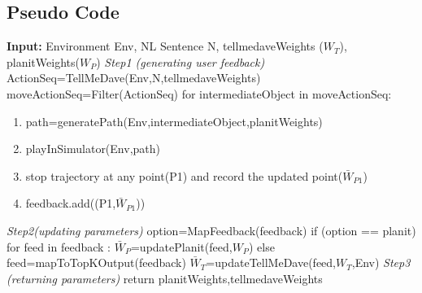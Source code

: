 \subsection{Pseudo Code}
\textbf{Input:} Environment Env, NL Sentence N, tellmedaveWeights ($W_{T}$), planitWeights($W_{P}$)
\newline \newline
\textit{Step1 (generating user feedback)} \newline \newline
ActionSeq=TellMeDave(Env,N,tellmedaveWeights)  
moveActionSeq=Filter(ActionSeq)  \newline  \newline
for intermediateObject in moveActionSeq:
\begin{enumerate}
\item path=generatePath(Env,intermediateObject,planitWeights)
\item playInSimulator(Env,path)
\item stop trajectory at any point(P1) and record the updated point($\bar{W}_{P1}$)
\item feedback.add((P1,$\bar{W}_{P1}$))
\end{enumerate}
\textit{Step2(updating parameters)} \newline \newline
option=MapFeedback(feedback) \newline
if (option == planit) \newline
\hphantom {1} \hphantom {1} for feed in feedback : \newline
\hphantom {1} \hphantom {1} \hphantom {1} $\bar{W}_{P}$=updatePlanit(feed,$W_{P}$) \newline
else \newline
\hphantom {1} \hphantom {1}feed=mapToTopKOutput(feedback) \newline
\hphantom {1} \hphantom {1}$\bar{W}_{T}$=updateTellMeDave(feed,$W_{T}$,Env) \newline
\newline
\textit{Step3 (returning parameters)} \newline 
return planitWeights,tellmedaveWeights \newline